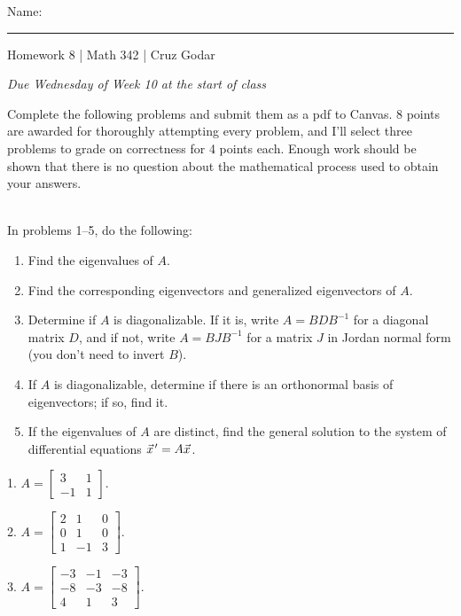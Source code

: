 \documentclass{article}
\begin{document}
\Large Name: \rule{2in}{0.15mm} \hfill Homework 8 | Math 342 | Cruz Godar \vspace{4pt}  \normalsize

\textit{Due Wednesday of Week 10 at the start of class}

Complete the following problems and submit them as a pdf to Canvas. 8 points are awarded for thoroughly attempting every problem, and I'll select three problems to grade on correctness for 4 points each. Enough work should be shown that there is no question about the mathematical process used to obtain your answers.

~\\

In problems 1--5, do the following:

\begin{enumerate}

	\item Find the eigenvalues of $A$.

	\item Find the corresponding eigenvectors and generalized eigenvectors of $A$.

	\item Determine if $A$ is diagonalizable. If it is, write $A = BDB^{-1}$ for a diagonal matrix $D$, and if not, write $A = BJB^{-1}$ for a matrix $J$ in Jordan normal form (you don't need to invert $B$).

	\item If $A$ is diagonalizable, determine if there is an orthonormal basis of eigenvectors; if so, find it.

	\item If the eigenvalues of $A$ are distinct, find the general solution to the system of differential equations $\vec{x}\hspace{0.1em}' = A\vec{x}$.

\end{enumerate}

1. $A = \left[\begin{array}{cc} 3& 1 \\ -1& 1 \end{array}\right]$.

2. $A = \left[\begin{array}{ccc} 2& 1& 0 \\ 0& 1& 0 \\ 1& -1& 3 \end{array}\right]$.

3. $A = \left[\begin{array}{ccc} -3& -1& -3 \\ -8& -3& -8 \\ 4& 1& 3 \end{array}\right]$.
\end{document}
